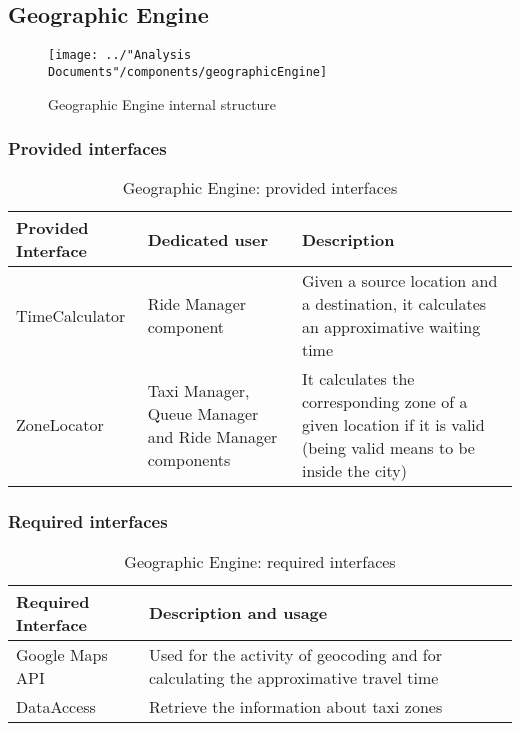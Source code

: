 \subsection{Geographic Engine}\label{comp:geographicEngine}
\begin{figure}[H]
	\centering
	\texttt{[image: ../"Analysis Documents"/components/geographicEngine]}
	\label{fig:geographicengine}
	\caption{Geographic Engine internal structure}
\end{figure}
\subsubsection{Provided interfaces}
\begin{table}[H]
	\begin{longtable}{| p{} | p{} | p{} |}
		\hline
		\textbf{Provided Interface} & \textbf{Dedicated user} & \textbf{Description} \\ \hline
		TimeCalculator & Ride Manager component & Given a source location and a destination, it calculates an approximative waiting time \\ \hline
		ZoneLocator & Taxi Manager, Queue Manager and Ride Manager components & It calculates the corresponding zone of a given location if it is valid (being valid means to be inside the city) \\ \hline
	\end{longtable}
	\caption{Geographic Engine: provided interfaces}
	\label{tab:geographicengine:providedInterfaces}
\end{table}
\subsubsection{Required interfaces}
\begin{table}[H]
	\begin{longtable}{| l | p{} |}
		\hline
		\textbf{Required Interface} & \textbf{Description and usage} \\ \hline
		Google Maps API & Used for the activity of geocoding and for calculating the approximative travel time \\ \hline
		DataAccess & Retrieve the information about taxi zones \\ \hline
	\end{longtable}
	\caption{Geographic Engine: required interfaces}
	\label{tab:geographicengine:requiredInterfaces}
\end{table}
